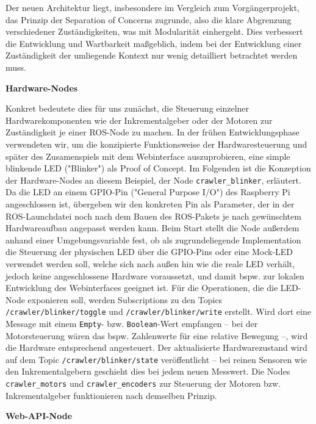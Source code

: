 Der neuen Architektur liegt, insbesondere im Vergleich zum Vorgängerprojekt, das Prinzip der Separation of Concerns zugrunde, also die klare Abgrenzung verschiedener Zuständigkeiten, was mit Modularität einhergeht. Dies verbessert die Entwicklung und Wartbarkeit maßgeblich, indem bei der Entwicklung einer Zuständigkeit der umliegende Kontext nur wenig detailliert betrachtet werden muss. 

\textbf{Hardware-Nodes}

Konkret bedeutete dies für uns zunächst, die Steuerung einzelner Hardwarekomponenten wie der Inkrementalgeber oder der Motoren zur Zuständigkeit je einer ROS-Node zu machen. In der frühen Entwicklungsphase verwendeten wir, um die konzipierte Funktionsweise der Hardwaresteuerung und später des Zusamenspiels mit dem Webinterface auszuprobieren, eine simple blinkende LED ("Blinker") als Proof of Concept. Im Folgenden ist die Konzeption der Hardware-Nodes an diesem Beispiel, der Node \texttt{crawler\_blinker}, erläutert. Da die LED an einem GPIO-Pin ("General Purpose I/O") des Raspberry Pi angeschlossen ist, übergeben wir den konkreten Pin als Parameter, der in der ROS-Launchdatei noch nach dem Bauen des ROS-Pakets je nach gewünschtem Hardwareaufbau angepasst werden kann. Beim Start stellt die Node außerdem anhand einer Umgebungsvariable fest, ob als zugrundeliegende Implementation die Steuerung der physischen LED über die GPIO-Pins oder eine Mock-LED verwendet werden soll, welche sich nach außen hin wie die reale LED verhält, jedoch keine angeschlossene Hardware voraussetzt, und damit bspw. zur lokalen Entwicklung des Webinterfaces geeignet ist. Für die Operationen, die die LED-Node exponieren soll, werden Subscriptions zu den Topics \texttt{/crawler/blinker/toggle} und \texttt{/crawler/blinker/write} erstellt. Wird dort eine Message mit einem \texttt{Empty}- bzw. \texttt{Boolean}-Wert empfangen -- bei der Motorsteuerung wären das bspw. Zahlenwerte für eine relative Bewegung --, wird die Hardware entsprechend angesteuert. Der aktualisierte Hardwarezustand wird auf dem Topic \texttt{/crawler/blinker/state} veröffentlicht -- bei reinen Sensoren wie den Inkrementalgebern geschieht dies bei jedem neuen Messwert. Die Nodes \texttt{crawler\_motors} und \texttt{crawler\_encoders} zur Steuerung der Motoren bzw. Inkrementalgeber funktionieren nach demselben Prinzip.

\textbf{Web-API-Node}

